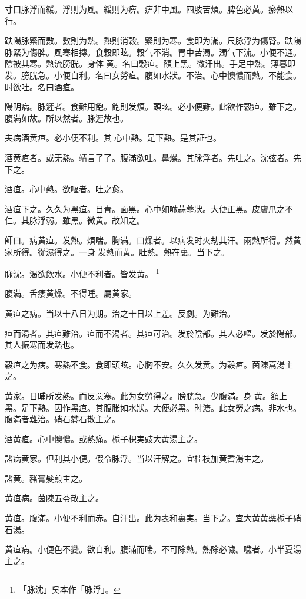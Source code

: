 寸口脉浮而緩。浮則为風。緩則为痹。痹非中風。四肢苦煩。脾色必黄。瘀熱以行。

趺陽脉緊而數。數則为熱。熱則消穀。緊則为寒。食即为滿。尺脉浮为傷腎。趺陽脉緊为傷脾。風寒相摶。食穀即眩。穀气不消。胃中苦濁。濁气下流。小便不通。陰被其寒。熱流膀胱。身体{\sungtpii 𥁞}黄。名曰穀疸。額上黑。微汗出。手足中熱。薄暮即发。膀胱急。小便自利。名曰女勞疸。腹如水狀。不治。心中懊憹而熱。不能食。时欲吐。名曰酒疸。

陽明病。脉遲者。食難用飽。飽則发煩。頭眩。必小便難。此欲作穀疸。雖下之。腹滿如故。所以然者。脉遲故也。

夫病酒黄疸。必小便不利。其{\sungtpii 𠊱}心中熱。足下熱。是其証也。

酒黄疸者。或无熱。靖言了{\khaaitp 了}。腹滿欲吐。鼻燥。其脉浮者。先吐之。沈弦者。先下之。

酒疸。心中熱。欲嘔者。吐之愈。

酒疸下之。久久为黑疸。目青。面黑。心中如噉蒜虀狀。大便正黑。皮膚爪之不仁。其脉浮弱。雖黑。微黄。故知之。

師曰。病黄疸。发熱。煩喘。胸滿。口燥者。以病发时火劫其汗。兩熱所得。然黄家所得。從濕得之。一身{\sungtpii 𥁞}发熱而黄。肚熱。熱在裏。当下之。

脉沈。渴欲飲水。小便不利者。皆发黄。
	\footnote{
		「脉沈」吳本作「脉浮」。
	}

腹滿。舌痿黄燥。不得睡。屬黄家。

黄疸之病。当以十八日为期。治之十日以上差。反劇。为難治。

疸而渴者。其疸難治。疸而不渴者。其疸可治。发於陰部。其人必嘔。{\khaaitp 发於}陽部。其人振寒而发熱也。

穀疸之为病。寒熱不食。食即頭眩。心胸不安。久久发黄。为穀疸。茵陳蒿湯主之。

黄家。日晡所发熱。而反惡寒。此为女勞得之。膀胱急。少腹滿。身{\sungtpii 𥁞}黄。額上黑。足下熱。因作黑疸。其腹胀如水狀。大便必黑。时溏。此女勞之病。非水也。腹滿者難治。硝石礬石散主之。

酒黄疸。心中懊憹。或熱痛。栀子{\khaaitp 枳実豉}大黄湯主之。

諸病黄家。但利其小便。假令脉浮。当以汗解之。宜桂枝加黄耆湯主之。

諸黄。豬膏髮煎主之。

黄疸病。茵陳五苓散主之。

黄疸。腹滿。小便不利而赤。自汗出。此为表和裏実。当下之。宜大黄{\khaaitp 黄蘗栀子}硝石湯。

黄疸病。小便色不變。欲自利。腹滿而喘。不可除熱。熱除必噦。噦者。小半夏湯主之。

